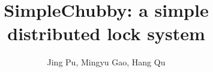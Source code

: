 \documentclass[11pt,twocolumn]{article}
\begin{document}
\title{\bf SimpleChubby: a simple distributed lock system}
\author{Jing Pu, Mingyu Gao, Hang Qu}
\date{}
\maketitle
\thispagestyle{empty}

\cite{mazieres2007paxos}








\end{document}
